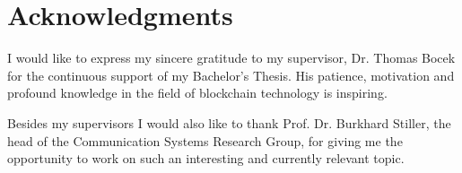 \chapter*{Acknowledgments}
I would like to express my sincere gratitude to my supervisor, Dr. Thomas Bocek for the continuous support of my Bachelor's Thesis. His patience, motivation and profound knowledge in the field of blockchain technology is inspiring. 

Besides my supervisors I would also like to thank Prof. Dr. Burkhard Stiller, the head of the Communication Systems Research Group, for giving me the opportunity to work on such an interesting and currently relevant topic.
